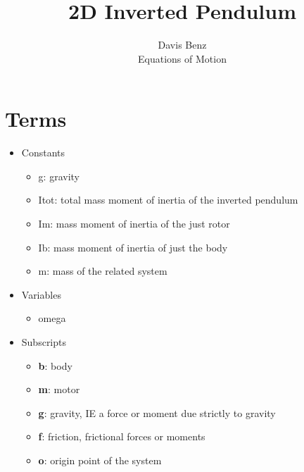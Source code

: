 \documentclass[12pt]{article}
\begin{document}
	
	\title{2D Inverted Pendulum}
	\author{Davis Benz\\
		    Equations of Motion}
	
	\maketitle
	
	\section{Terms}
		\begin{itemize}
			\item Constants
				\begin{itemize}
					\item g: gravity
					\item Itot: total mass moment of inertia of the inverted pendulum
					\item Im: mass moment of inertia of the just rotor
					\item Ib: mass moment of inertia of just the body
					\item m: mass of the related system
				\end{itemize}
			\item Variables
				\begin{itemize}
					\item omega
				\end{itemize}
			\item Subscripts
			\begin{itemize}
				\item \textbf{b}: body
				\item \textbf{m}: motor
				\item \textbf{g}: gravity, IE a force or moment due strictly to gravity
				\item \textbf{f}: friction, frictional forces or moments
				\item \textbf{o}: origin point of the system
			\end{itemize}
		\end{itemize}
\end{document}
